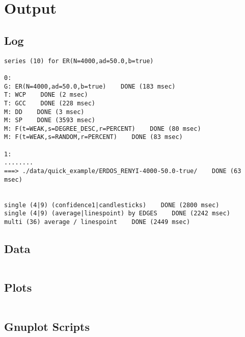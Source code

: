 
\section{Output}
\label{sec:output}


\subsection{Log}

\begin{verbatim}
series (10) for ER(N=4000,ad=50.0,b=true)

0:
G: ER(N=4000,ad=50.0,b=true)    DONE (183 msec)
T: WCP    DONE (2 msec)
T: GCC    DONE (228 msec)
M: DD    DONE (3 msec)
M: SP    DONE (3593 msec)
M: F(t=WEAK,s=DEGREE_DESC,r=PERCENT)    DONE (80 msec)
M: F(t=WEAK,s=RANDOM,r=PERCENT)    DONE (83 msec)

1:
........
===> ./data/quick_example/ERDOS_RENYI-4000-50.0-true/    DONE (63 msec)


single (4|9) (confidence1|candlesticks)    DONE (2800 msec)
single (4|9) (average|linespoint) by EDGES    DONE (2242 msec)
multi (36) average / linespoint    DONE (2449 msec)
\end{verbatim}




\subsection{Data}

\begin{verbatim}

\end{verbatim}




\subsection{Plots}

\begin{verbatim}

\end{verbatim}




\subsection{Gnuplot Scripts}

\begin{verbatim}

\end{verbatim}


